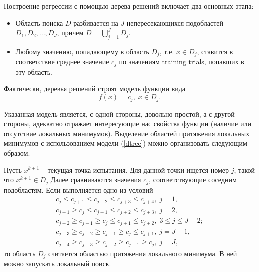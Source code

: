 \documentclass[entropy,article,submit,moreauthors,pdftex]{Definitions/mdpi}
\begin{document}
Построение регрессии с помощью дерева решений включает два основных этапа:
\begin{itemize}
	\item Область поиска $D$ разбивается на $J$ непересекающихся подобластей $D_1, D_2, ..., D_J$, причем $D = \bigcup_{j=1}^{J}{D_j}$.
	\item Любому значению, попадающему в область $D_j$, т.е. $x \in D_j$, ставится в соответствие среднее значение $c_j$ по значениям training trials, попавших в эту область.
\end{itemize}

Фактически, деревья решений строят модель функции вида
\begin{equation}\label{dtree}
f(x) = c_j, \; x\in D_j.
\end{equation}
 
Указанная модель является, с одной стороны, довольно простой, а с другой стороны, адекватно отражает интересующие нас свойства функции (наличие или отсутствие локальных минимумов). Выделение областей притяжения локальных минимумов с использованием модели (\ref{dtree}) можно организовать следующим образом.

Пусть $x^{k+1}$ -- текущая точка испытания. Для данной точки ищется номер $j$, такой что $x^{k+1} \in D_j$ 
Далее сравниваются значения $c_j$, соответствующие соседним подобластям. Если выполняется одно из условий
\begin{gather}\label{LocalPointC}
c_{j} \leq c_{j+1} \leq c_{j+2} \leq c_{j+3} \leq c_{j+4}, \; j=1, \\ \nonumber
c_{j-1} \geq c_{j} \leq c_{j+1} \leq c_{j+2} \leq c_{j+3}, \; j=2,  \\ \nonumber
c_{j-2} \geq c_{j-1} \geq c_{j} \leq c_{j+1} \leq c_{j+2}, \; 3 \leq j \leq J-2;\\
c_{j-3} \geq c_{j-2} \geq c_{j-1} \geq c_{j} \leq c_{j+1}, \; j=J-1, \\ \nonumber
c_{j-4} \geq c_{j-3} \geq c_{j-2} \geq c_{j-1} \geq c_{j}, \; j=J, \nonumber
\end{gather}
то область $D_j$ считается областью притяжения локального минимума. В ней можно запускать локальный поиск.

\end{document}

